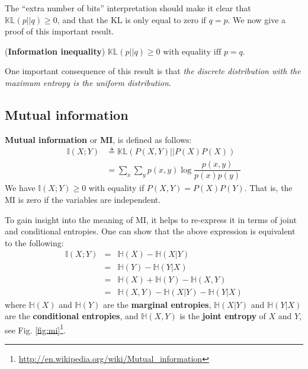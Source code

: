The “extra number of bits” interpretation should make it clear that $\mathbb{KL}(p||q) \geq 0$, and that the KL is only equal to zero if $q = p$. We now give a proof of this important result.

\begin{theorem}
(\textbf{Information inequality}) $\mathbb{KL}(p||q) \geq 0 \text{ with equality iff } p=q$.
\end{theorem}

One important consequence of this result is that \emph{the discrete distribution with the maximum
entropy is the uniform distribution}.


\subsection{Mutual information}
\label{sec:Mutual-information}
\begin{definition}
\textbf{Mutual information} or \textbf{MI}, is defined as follows:
\begin{equation}\begin{split}
\mathbb{I}(X;Y) & \triangleq \mathbb{KL}(P(X,Y)||P(X)P(X)) \\
    & =\sum\limits_x\sum\limits_yp(x,y)\log\dfrac{p(x,y)}{p(x)p(y)}
\end{split}\end{equation}
We have $\mathbb{I}(X;Y) \geq 0$ with equality if $P(X,Y)=P(X)P(Y)$. That is, the MI is zero if the variables are independent.
\end{definition}

To gain insight into the meaning of MI, it helps to re-express it in terms of joint and conditional entropies. One can show that the above expression is equivalent to the following:
\begin{eqnarray}
\mathbb{I}(X;Y)&=&\mathbb{H}(X)-\mathbb{H}(X|Y)\\
               &=&\mathbb{H}(Y)-\mathbb{H}(Y|X)\\
               &=&\mathbb{H}(X)+\mathbb{H}(Y)-\mathbb{H}(X,Y)\\
               &=&\mathbb{H}(X,Y)-\mathbb{H}(X|Y)-\mathbb{H}(Y|X)
\end{eqnarray}
where $\mathbb{H}(X)$ and $\mathbb{H}(Y)$ are the \textbf{marginal entropies}, $\mathbb{H}(X|Y)$ and $\mathbb{H}(Y|X)$ are the \textbf{conditional entropies}, and $\mathbb{H}(X,Y)$ is the \textbf{joint entropy} of $X$ and $Y$, see Fig. \ref{fig:mi}\footnote{\url{http://en.wikipedia.org/wiki/Mutual_information}}.

